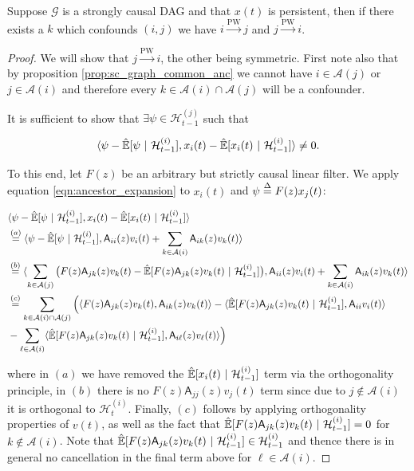 \documentclass[12pt]{article}
\def\pwgc{\overset{\text{PW}}{\rightarrow}}  %
\def\gcg{\mathcal{G}}  %
\def\A{\mathsf{A}}  %
\def\H{\mathcal{H}}  %
\newcommand{\linE}[2]{\hat{\E}[#1\ |\ #2]}  %
\newcommand{\anc}[1]{\mathcal{A}(#1)}  %
\begin{document}
\begin{proposition}
  \label{prop:persistence_converse}
  Suppose $\gcg$ is a strongly causal DAG and that $x(t)$ is
  persistent, then if there exists a $k$ which confounds $(i, j)$ we
  have $i \pwgc j$ and $j \pwgc i$.
\end{proposition}
\begin{proof}
  We will show that $j \pwgc i$, the other being symmetric.  First
  note also that by proposition \ref{prop:sc_graph_common_anc} we
  cannot have $i \in \anc{j}$ or $j \in \anc{i}$ and therefore every
  $k \in \anc{i}\cap\anc{j}$ will be a confounder.

  It is sufficient to show that $\exists \psi \in \H_{t - 1}^{(j)}$
  such that

  \begin{equation*}
    \inner{\psi - \linE{\psi}{\H_{t - 1}^{(i)}}}{x_i(t) - \linE{x_i(t)}{\H_{t - 1}^{(i)}}} \ne 0.
  \end{equation*}

  To this end, let $F(z)$ be an arbitrary but strictly causal linear
  filter.  We apply equation \eqref{eqn:ancestor_expansion} to
  $x_i(t)$ and $\psi \overset{\Delta}{=} F(z)x_j(t)$:

  \begin{align*}
    &\inner{\psi - \linE{\psi}{\H_{t - 1}^{(i)}}}{x_i(t) - \linE{x_i(t)}{\H_{t - 1}^{(i)}}}\\
    &\overset{(a)}{=} \inner{\psi - \linE{\psi}{\H_{t - 1}^{(i)}}}{\A_{ii}(z)v_i(t) + \sum_{k \in \anc{i}}\A_{ik}(z)v_k(t)}\\
    &\overset{(b)}{=} \inner{\sum_{k \in \anc{j}}\big(F(z)\A_{jk}(z)v_k(t) - \linE{F(z)\A_{jk}(z)v_k(t)}{\H_{t - 1}^{(i)}}\big)}{\A_{ii}(z)v_i(t) + \sum_{k \in \anc{i}}\A_{ik}(z)v_k(t)}\\
    &\overset{(c)}{=} \sum_{k \in \anc{i}\cap\anc{j}}\Big(\inner{F(z)\A_{jk}(z)v_k(t)}{\A_{ik}(z)v_k(t)} - \inner{\linE{F(z)\A_{jk}(z)v_k(t)}{\H_{t - 1}^{(i)}}}{\A_{ii}v_i(t)}\\
    &- \sum_{\ell \in \anc{i}}\inner{\linE{F(z)\A_{jk}(z)v_k(t)}{\H_{t - 1}^{(i)}}}{\A_{i\ell}(z)v_\ell(t)}\Big)
  \end{align*}

  where in $(a)$ we have removed the $\linE{x_i(t)}{\H_{t - 1}^{(i)}}$
  term via the orthogonality principle, in $(b)$ there is no
  $F(z)\A_{jj}(z)v_j(t)$ term since due to $j \not\in \anc{i}$ it is
  orthogonal to $\H_t^{(i)}$.  Finally, $(c)$ follows by applying
  orthogonality properties of $v(t)$, as well as the fact that
  $\linE{F(z)\A_{jk}(z)v_k(t)}{\H_{t - 1}^{(i)}} = 0$ for
  $k \not \in \anc{i}$.  Note that
  $\linE{F(z)\A_{jk}(z)v_k(t)}{\H_{t - 1}^{(i)}} \in \H_{t - 1}^{(i)}$
  and thence there is in general no cancellation in the final term
  above for $\ell \in \anc{i}$.


\end{proof}
\end{document}
